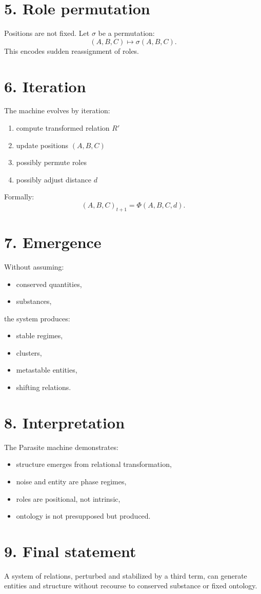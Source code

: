 \documentclass[11pt]{article}
\begin{document}
\section*{5. Role permutation}
Positions are not fixed. Let $\sigma$ be a permutation:
\[
(A,B,C) \mapsto \sigma(A,B,C).
\]
This encodes sudden reassignment of roles.

\section*{6. Iteration}
The machine evolves by iteration:
\begin{enumerate}[leftmargin=2em]
\item compute transformed relation $R'$
\item update positions $(A,B,C)$
\item possibly permute roles
\item possibly adjust distance $d$
\end{enumerate}
Formally:
\[
(A,B,C)_{t+1} = \Phi(A,B,C,d).
\]

\section*{7. Emergence}
Without assuming:
\begin{itemize}[leftmargin=2em]
\item conserved quantities,
\item substances,
\end{itemize}
the system produces:
\begin{itemize}[leftmargin=2em]
\item stable regimes,
\item clusters,
\item metastable entities,
\item shifting relations.
\end{itemize}

\section*{8. Interpretation}
The Parasite machine demonstrates:
\begin{itemize}[leftmargin=2em]
\item structure emerges from relational transformation,
\item noise and entity are phase regimes,
\item roles are positional, not intrinsic,
\item ontology is not presupposed but produced.
\end{itemize}

\section*{9. Final statement}
A system of relations, perturbed and stabilized by a third term, can generate entities and structure without recourse to conserved substance or fixed ontology.
\end{document}
